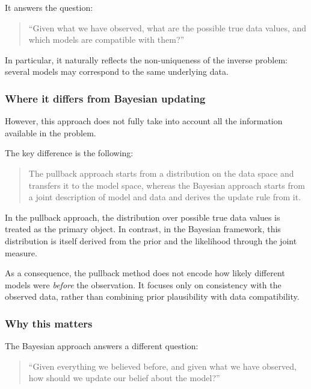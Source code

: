 \documentclass[11pt]{article}
\theoremstyle{remark}
\begin{document}
It answers the question:

\begin{quote}
``Given what we have observed, what are the possible true data values, and which models are compatible with them?''
\end{quote}

In particular, it naturally reflects the non-uniqueness of the inverse problem: several models may correspond to the same underlying data.

\vspace{2mm}

\subsubsection{Where it differs from Bayesian updating}

However, this approach does not fully take into account all the information available in the problem.

The key difference is the following:

\begin{quote}
The pullback approach starts from a distribution on the data space and transfers it to the model space, whereas the Bayesian approach starts from a joint description of model and data and derives the update rule from it.
\end{quote}

In the pullback approach, the distribution over possible true data values is treated as the primary object. In contrast, in the Bayesian framework, this distribution is itself derived from the prior and the likelihood through the joint measure.

\vspace{2mm}

As a consequence, the pullback method does not encode how likely different models were \emph{before} the observation. It focuses only on consistency with the observed data, rather than combining prior plausibility with data compatibility.

\vspace{2mm}

\subsubsection{Why this matters}

The Bayesian approach answers a different question:

\begin{quote}
``Given everything we believed before, and given what we have observed, how should we update our belief about the model?''
\end{quote}
\end{document}
